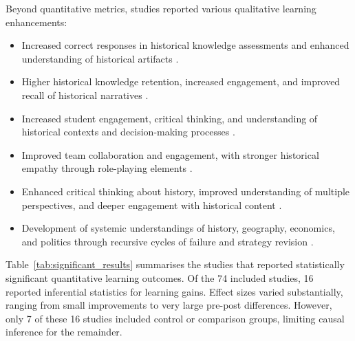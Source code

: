 \documentclass[a4paper,fleqn]{cas-sc}
\begin{document}
Beyond quantitative metrics, studies reported various qualitative learning enhancements:

\begin{itemize}[noitemsep]
 \item Increased correct responses in historical knowledge assessments and enhanced understanding of historical artifacts \citep{1Barbatsis201159}.
 
 \item Higher historical knowledge retention, increased engagement, and improved recall of historical narratives \citep{2Mahamarowi2023133}.
 
 \item Increased student engagement, critical thinking, and understanding of historical contexts and decision-making processes \citep{3Watson2011466}.
 
 \item Improved team collaboration and engagement, with stronger historical empathy through role-playing elements \citep{46Stirling2022}.
 
 \item Enhanced critical thinking about history, improved understanding of multiple perspectives, and deeper engagement with historical content \citep{71lynch2015pedagogical}.
 
 \item Development of systemic understandings of history, geography, economics, and politics through recursive cycles of failure and strategy revision \citep{74Fendt2019}.
\end{itemize}

Table~\ref{tab:significant_results} summarises the studies that reported statistically significant quantitative learning outcomes. Of the 74 included studies, 16 reported inferential statistics for learning gains. Effect sizes varied substantially, ranging from small improvements to very large pre-post differences. However, only 7 of these 16 studies included control or comparison groups, limiting causal inference for the remainder.
\end{document}
